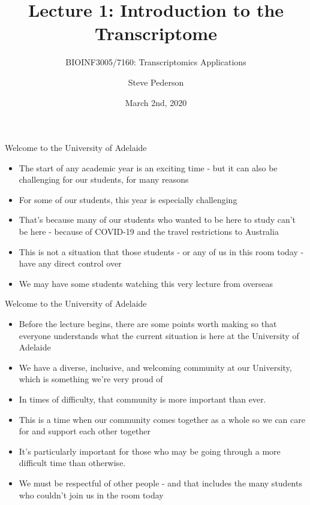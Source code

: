 \documentclass[11pt]{beamer}
\author{Steve Pederson}
\title{Lecture 1: Introduction to the Transcriptome}
\subtitle{BIOINF3005/7160: Transcriptomics Applications}
\institute{University of Adelaide}
\date{March 2nd, 2020}
\begin{document}
\begin{frame}
\titlepage
\end{frame}


\begin{frame}{Welcome to the University of Adelaide}

	\begin{itemize}
		\item The start of any academic year is an exciting time - but it can also be challenging for our students, for many reasons
		\item For some of our students, this year is especially challenging
		\item That’s because many of our students who wanted to be here to study can’t be here - because of COVID-19 and the travel restrictions to Australia
		\item This is not a situation that those students - or any of us in this room today - have any direct control over
		\item We may have some students watching this very lecture from overseas
	\end{itemize}
	
\end{frame}

\begin{frame}{Welcome to the University of Adelaide}

	\begin{itemize}
		\item Before the lecture begins, there are some points worth making so that everyone understands what the current situation is here at the University of Adelaide
		\item We have a diverse, inclusive, and welcoming community at our University, which is something we’re very proud of
		\item In times of difficulty, that community is more important than ever.
		\item This is a time when our community comes together as a whole so we can care for and support each other together
		\item It’s particularly important for those who may be going through a more difficult time than otherwise. 
		\item We must be respectful of other people - and that includes the many students who couldn’t join us in the room today
	\end{itemize}

\end{frame}
\end{document}
